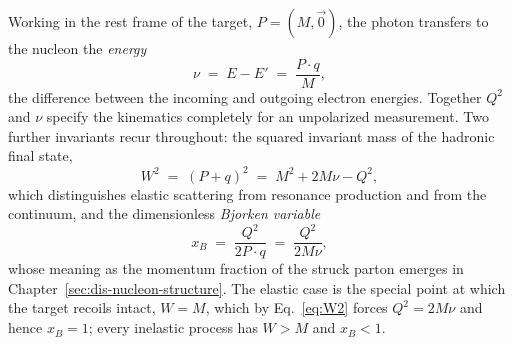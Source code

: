 Working in the rest frame of the target, $P=(M,\vec 0)$, the photon transfers to the
nucleon the \emph{energy}
\begin{equation}
    \nu \;=\; E - E' \;=\; \frac{P\cdot q}{M},
    \label{eq:nu}
\end{equation}
the difference between the incoming and outgoing electron energies. Together $Q^{2}$
and $\nu$ specify the kinematics completely for an unpolarized measurement. Two
further invariants recur throughout: the squared invariant mass of the hadronic final
state,
\begin{equation}
    W^{2} \;=\; (P+q)^{2} \;=\; M^{2} + 2M\nu - Q^{2},
    \label{eq:W2}
\end{equation}
which distinguishes elastic scattering from resonance production and from the
continuum, and the dimensionless \emph{Bjorken variable}
\begin{equation}
    x_{B} \;=\; \frac{Q^{2}}{2P\cdot q} \;=\; \frac{Q^{2}}{2M\nu},
    \label{eq:xbj}
\end{equation}
whose meaning as the momentum fraction of the struck parton emerges in
Chapter~\ref{sec:dis-nucleon-structure}. The elastic case is the special point at
which the target recoils intact, $W = M$, which by Eq.~\eqref{eq:W2} forces
$Q^{2}=2M\nu$ and hence $x_{B}=1$; every inelastic process has $W>M$ and $x_{B}<1$.

